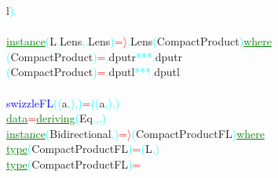 {\rm{}l}\textcolor{cyan}{)}\hsspace \textcolor{cyan}{.}\\\\\textcolor{green}{\underline{instance}}\hsspace \textcolor{cyan}{(}{\rm{}L}\textcolor{cyan}{.}{\rm{}Lens}\textcolor{cyan}{,}\textcolor{cyan}{.}{\rm{}Lens}\textcolor{cyan}{)}\hsspace \textcolor{red}{=\ensuremath{\rangle}}\textcolor{cyan}{.}{\rm{}Lens}\hsspace \textcolor{cyan}{(}{\rm{}CompactProduct}\textcolor{cyan}{)}\hsspace \textcolor{green}{\underline{where}}\\\hsspace \textcolor{cyan}{(}{\rm{}CompactProduct}\textcolor{cyan}{)}\hsspace \textcolor{red}{=}\textcolor{cyan}{.}{\rm{}dputr}\hsspace \textcolor{cyan}{***}\textcolor{cyan}{.}{\rm{}dputr}\\\hsspace \textcolor{cyan}{(}{\rm{}CompactProduct}\textcolor{cyan}{)}\hsspace \textcolor{red}{=}\textcolor{cyan}{.}{\rm{}dputl}\hsspace \textcolor{cyan}{***}\textcolor{cyan}{.}{\rm{}dputl}\\\\\textcolor{blue}{swizzleFL}\hsspace \textcolor{cyan}{(}\textcolor{cyan}{(}{\rm{}a}\textcolor{cyan}{,}\textcolor{cyan}{)}\textcolor{cyan}{,}\textcolor{cyan}{)}\hsspace \textcolor{red}{=}\hsspace \textcolor{cyan}{(}\textcolor{cyan}{(}{\rm{}a}\textcolor{cyan}{,}\textcolor{cyan}{)}\textcolor{cyan}{,}\textcolor{cyan}{)}\\\textcolor{green}{\underline{data}}\hsspace \textcolor{red}{=}\hsspace \textcolor{green}{\underline{deriving}}\hsspace \textcolor{cyan}{(}{\rm{}Eq}\textcolor{cyan}{,}\textcolor{cyan}{,}\textcolor{cyan}{,}\textcolor{cyan}{)}\\\textcolor{green}{\underline{instance}}\hsspace \textcolor{cyan}{(}{\rm{}Bidirectional}\textcolor{cyan}{,}\textcolor{cyan}{)}\hsspace \textcolor{red}{=\ensuremath{\rangle}}\hsspace \textcolor{cyan}{(}{\rm{}CompactProductFL}\textcolor{cyan}{)}\hsspace \textcolor{green}{\underline{where}}\\\hstab \textcolor{green}{\underline{type}}\hsspace \textcolor{cyan}{(}{\rm{}CompactProductFL}\textcolor{cyan}{)}\hsspace \textcolor{red}{=}\hsspace \textcolor{cyan}{(}{\rm{}L}\textcolor{cyan}{,}\textcolor{cyan}{)}\\\hstab \textcolor{green}{\underline{type}}\hsspace \textcolor{cyan}{(}{\rm{}CompactProductFL}\textcolor{cyan}{)}\hsspace \textcolor{red}{=}\hsspace 